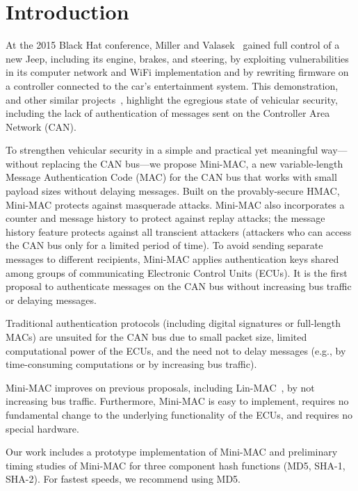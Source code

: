 \section{Introduction}
\label{intro}

At the 2015 Black Hat conference, Miller and Valasek~\cite{blackhat} gained full control of a new Jeep,
including its engine, brakes, and steering, by exploiting vulnerabilities in its
computer network and WiFi implementation and by rewriting firmware on a controller connected to the car's entertainment system.
This demonstration, and other similar 
projects~\cite{Rouf2010,Koscher-2010,Checkoway-2011,Woo-14,C2X}, 
highlight the egregious state of vehicular security, including the lack of 
authentication of messages sent on the Controller Area Network (CAN).   

To strengthen vehicular security in a simple and practical 
yet meaningful way---without replacing the CAN bus---we propose Mini-MAC, 
a new variable-length Message Authentication Code (MAC)
for the CAN bus that works with small payload sizes without delaying messages.  
Built on the provably-secure HMAC, Mini-MAC protects against masquerade attacks.  
Mini-MAC also incorporates a counter and message history to protect against replay attacks;
the message history feature protects against all transcient attackers (attackers
who can access the CAN bus only for a limited period of time).
To avoid sending separate messages to different recipients, Mini-MAC applies authentication keys
shared among groups of communicating Electronic Control Units (ECUs).
It is the first proposal to authenticate messages on the CAN bus without increasing bus traffic
or delaying messages. 

Traditional authentication protocols (including digital signatures or full-length MACs) are unsuited for the CAN bus due to
small packet size, limited computational power of the ECUs,
and the need not to delay messages (e.g., by time-consuming computations or by
increasing bus traffic).   

Mini-MAC improves on previous proposals, including Lin-MAC~\cite{Lin-MAC}, by not increasing bus traffic.
Furthermore, Mini-MAC is easy to implement,
requires no fundamental change to the underlying functionality of the ECUs, and 
requires no special hardware.

Our work includes a prototype implementation of Mini-MAC and preliminary timing studies 
of Mini-MAC for three component hash functions (MD5, SHA-1, SHA-2).  For fastest speeds, 
we recommend using MD5.

